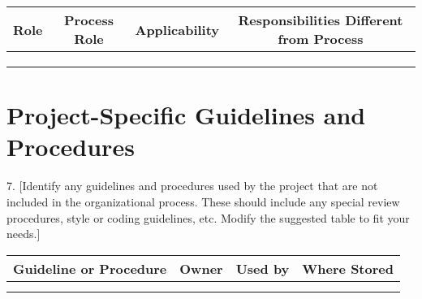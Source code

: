 \begin{adjustbox}{width=\textwidth}
\begin{tabular}{|c|c|c|c|}
    \hline
    Role&  Process Role & Applicability  &Responsibilities Different from Process \\ \hline
    &&& \\ \hline
    &&& \\ \hline
    &&& \\ \hline
\end{tabular}
\end{adjustbox}

 	 
\section*{Project-Specific Guidelines and Procedures} 	 
7. 
[Identify any guidelines and procedures used by the project that are not included in the organizational process. These should include any special review procedures, style or coding guidelines, etc. Modify the suggested table to fit your needs.]

\begin{tabular}{|c|c|c|c|}
    \hline
    Guideline or Procedure& Owner  & Used by  & Where Stored\\ \hline
    &&& \\ \hline
    &&& \\ \hline
\end{tabular}
